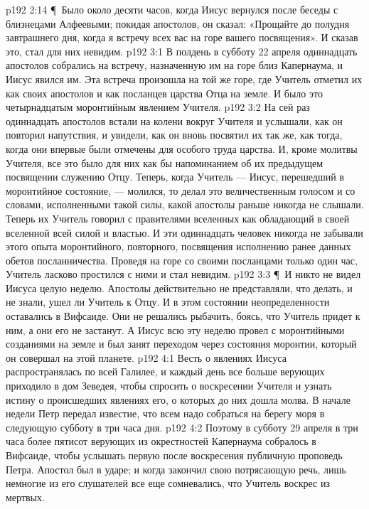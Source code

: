 \vs p192 2:14 \P\ Было около десяти часов, когда Иисус вернулся после беседы с близнецами Алфеевыми; покидая апостолов, он сказал: «Прощайте до полудня завтрашнего дня, когда я встречу всех вас на горе вашего посвящения». И сказав это, стал для них невидим.
\vs p192 3:1 В полдень в субботу 22 апреля одиннадцать апостолов собрались на встречу, назначенную им на горе близ Капернаума, и Иисус явился им. Эта встреча произошла на той же горе, где Учитель отметил их как своих апостолов и как посланцев царства Отца на земле. И было это четырнадцатым моронтийным явлением Учителя.
\vs p192 3:2 На сей раз одиннадцать апостолов встали на колени вокруг Учителя и услышали, как он повторил напутствия, и увидели, как он вновь посвятил их так же, как тогда, когда они впервые были отмечены для особого труда царства. И, кроме молитвы Учителя, все это было для них как бы напоминанием об их предыдущем посвящении служению Отцу. Теперь, когда Учитель --- Иисус, перешедший в моронтийное состояние, --- молился, то делал это величественным голосом и со словами, исполненными такой силы, какой апостолы раньше никогда не слышали. Теперь их Учитель говорил с правителями вселенных как обладающий в своей вселенной всей силой и властью. И эти одиннадцать человек никогда не забывали этого опыта моронтийного, повторного, посвящения исполнению ранее данных обетов посланничества. Проведя на горе со своими посланцами только один час, Учитель ласково простился с ними и стал невидим.
\vs p192 3:3 \P\ И никто не видел Иисуса целую неделю. Апостолы действительно не представляли, что делать, и не знали, ушел ли Учитель к Отцу. И в этом состоянии неопределенности оставались в Вифсаиде. Они не решались рыбачить, боясь, что Учитель придет к ним, а они его не застанут. А Иисус всю эту неделю провел с моронтийными созданиями на земле и был занят переходом через состояния моронтии, который он совершал на этой планете.
\vs p192 4:1 Весть о явлениях Иисуса распространялась по всей Галилее, и каждый день все больше верующих приходило в дом Зеведея, чтобы спросить о воскресении Учителя и узнать истину о происшедших явлениях его, о которых до них дошла молва. В начале недели Петр передал известие, что всем надо собраться на берегу моря в следующую субботу в три часа дня.
\vs p192 4:2 Поэтому в субботу 29 апреля в три часа более пятисот верующих из окрестностей Капернаума собралось в Вифсаиде, чтобы услышать первую после воскресения публичную проповедь Петра. Апостол был в ударе; и когда закончил свою потрясающую речь, лишь немногие из его слушателей все еще сомневались, что Учитель воскрес из мертвых.
